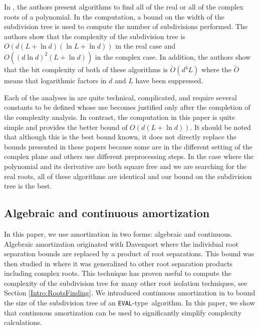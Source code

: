 \documentclass{amsart}
\theoremstyle{definition}
\newcommand{\EVALTYPE}{\texttt{EVAL}-type}
\begin{document}
In \citep{sagraloff-yap:ceval:09}, the authors present algorithms to find all of the real or all of the complex roots of a polynomial.  In the computation, a bound on the width of the subdivision tree is used to compute the number of subdivisions performed.  The authors show that the complexity of the subdivision tree is $O(d(L+\ln d)(\ln L+\ln d))$ in the real case and $O((d\ln d)^2(L+\ln d))$ in the complex case.  In addition, the authors show that the bit complexity of both of these algorithms is $\widetilde{O}(d^4L)$ where the $\widetilde{O}$ means that logarithmic factors in $d$ and $L$ have been suppressed.

Each of the analyses in \citep{Yakoubsohn:bisection:05,Burr-Krahmer-Yap:integral:09,sagraloff-yap:ceval:09} are quite technical, complicated, and require several constants to be defined whose use becomes justified only after the completion of the complexity analysis.  In contrast, the computation in this paper is quite simple and provides the better bound of $O(d(L+\ln d))$.  It should be noted that although this is the best bound known, it does not directly replace the bounds presented in these papers because some are in the different setting of the complex plane and others use different preprocessing steps.  In the case where the polynomial and its derivative are both square free and we are searching for the real roots, all of these algorithms are identical and our bound on the subdivision tree is the best.

\subsection{Algebraic and continuous amortization}
In this paper, we use amortization in two forms: algebraic and continuous.  Algebraic amortization originated with Davenport \citep{davenport:85} where the individual root separation bounds are replaced by a product of root separations.  This bound was then studied in \citep{du-sharma-yap:sturm:07,eigenwillig-sharma-yap:descartes:06} where it was generalized to other root separation products including complex roots.  This technique has proven useful to compute the complexity of the subdivision tree for many other root isolation techniques, see Section \ref{Intro:RootsFinding}.  We introduced continuous amortization in \citep{Burr-Krahmer-Yap:integral:09} to bound the size of the subdivision tree of an \EVALTYPE\ algorithm.  In this paper, we show that continuous amortization can be used to significantly simplify complexity calculations.
\end{document}
